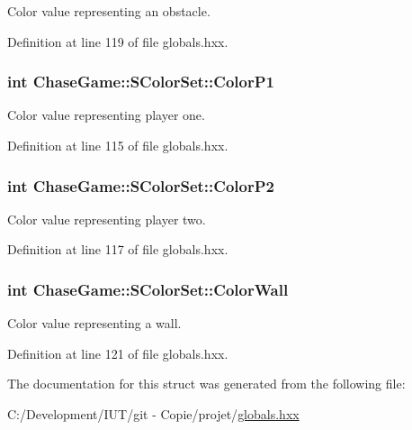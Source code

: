 Color value representing an obstacle. 



Definition at line 119 of file globals.\-hxx.

\hypertarget{struct_chase_game_1_1_s_color_set_a51e5a557359624fe92be93cb80621922}{
\subsubsection[{Color\-P1}]{\setlength{\rightskip}{0pt plus 5cm}int Chase\-Game\-::\-S\-Color\-Set\-::\-Color\-P1}}\label{struct_chase_game_1_1_s_color_set_a51e5a557359624fe92be93cb80621922}


Color value representing player one. 



Definition at line 115 of file globals.\-hxx.

\hypertarget{struct_chase_game_1_1_s_color_set_a777bce7519236b269ba44d921f54e4e8}{
\subsubsection[{Color\-P2}]{\setlength{\rightskip}{0pt plus 5cm}int Chase\-Game\-::\-S\-Color\-Set\-::\-Color\-P2}}\label{struct_chase_game_1_1_s_color_set_a777bce7519236b269ba44d921f54e4e8}


Color value representing player two. 



Definition at line 117 of file globals.\-hxx.

\hypertarget{struct_chase_game_1_1_s_color_set_a7a7a8dae118390ce5b4432aa4d99a474}{
\subsubsection[{Color\-Wall}]{\setlength{\rightskip}{0pt plus 5cm}int Chase\-Game\-::\-S\-Color\-Set\-::\-Color\-Wall}}\label{struct_chase_game_1_1_s_color_set_a7a7a8dae118390ce5b4432aa4d99a474}


Color value representing a wall. 



Definition at line 121 of file globals.\-hxx.



The documentation for this struct was generated from the following file\-:\begin{DoxyCompactItemize}
\item 
C\-:/\-Development/\-I\-U\-T/git -\/ Copie/projet/\hyperlink{globals_8hxx}{globals.\-hxx}\end{DoxyCompactItemize}
